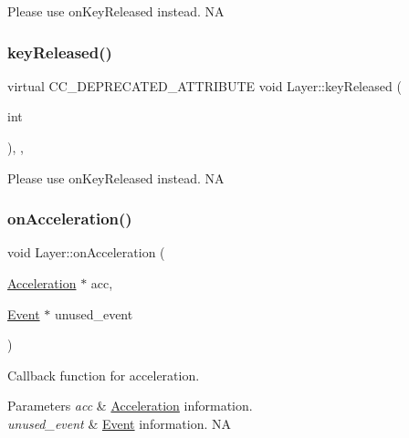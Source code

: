 Please use on\+Key\+Released instead.  NA \mbox{\label{classLayer_ad7e6ea710a36e46dace8acb93eee10f9}} 
\subsubsection{\texorpdfstring{key\+Released()}{keyReleased()}\hspace{0.1cm}{\footnotesize\ttfamily [2/2]}}
{\footnotesize\ttfamily virtual C\+C\+\_\+\+D\+E\+P\+R\+E\+C\+A\+T\+E\+D\+\_\+\+A\+T\+T\+R\+I\+B\+U\+TE void Layer\+::key\+Released (\begin{DoxyParamCaption}\item[{int}]{ }\end{DoxyParamCaption})\hspace{0.3cm}{\ttfamily [inline]}, {\ttfamily [final]}, {\ttfamily [virtual]}}

Please use on\+Key\+Released instead.  NA \mbox{\label{classLayer_a8ae68656f6cceffb0c12336d3bef82cd}} 
\subsubsection{\texorpdfstring{on\+Acceleration()}{onAcceleration()}\hspace{0.1cm}{\footnotesize\ttfamily [1/2]}}
{\footnotesize\ttfamily void Layer\+::on\+Acceleration (\begin{DoxyParamCaption}\item[{\hyperlink{classAcceleration}{Acceleration} $\ast$}]{acc,  }\item[{\hyperlink{classEvent}{Event} $\ast$}]{unused\+\_\+event }\end{DoxyParamCaption})\hspace{0.3cm}{\ttfamily [virtual]}}

Callback function for acceleration. 
\begin{DoxyParams}{Parameters}
{\em acc} & \hyperlink{classAcceleration}{Acceleration} information. \\
\hline
{\em unused\+\_\+event} & \hyperlink{classEvent}{Event} information.  NA \\
\hline
\end{DoxyParams}
\mbox{\label{classLayer_a85943c6937c71bafbbde26980eec9007}} 
